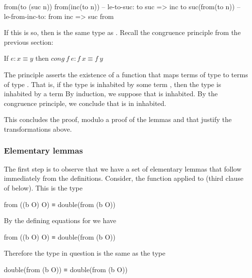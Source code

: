\begin{colored}[elm]
from(to (suc n))
from(inc(to n))  -- le-to-suc: to suc => inc to
suc(from(to n))  -- le-from-inc-to: from inc => suc from
\end{colored}

If this is so, then  is the same type as .  Recall the congruence principle from the previous section:

\begin{indent}
If $e : x \equiv y$ then $cong\ f\ e: f\ x \equiv f\ y$
\end{indent}

The principle asserts the existence of a function  that maps terms of type   to terms of type .   That is, if the type   is inhabited by some term , then the type  is inhabited by a term 
By induction, we suppose that  is inhabited.  By the congruence principle, we conclude that  is in inhabited.

This concludes the proof, modulo a proof of the lemmas  and  that justify the transformations above.


\subsubsection{Elementary lemmas}

The first step is to observe that we have a set of elementary lemmas that follow immediately from the definitions.  Consider, the function  applied  to  (third clause of  below). This is the type


\begin{colored}[elm]
from ((b O) O) ≡ double(from (b O))
\end{colored}

By the defining equations for  we have

\begin{colored}[elm]
from ((b O) O) ≡ double(from (b O))
\end{colored}

Therefore the type in question is the same as the type

\begin{colored}[elm]
double(from (b O)) ≡ double(from (b O))
\end{colored}

